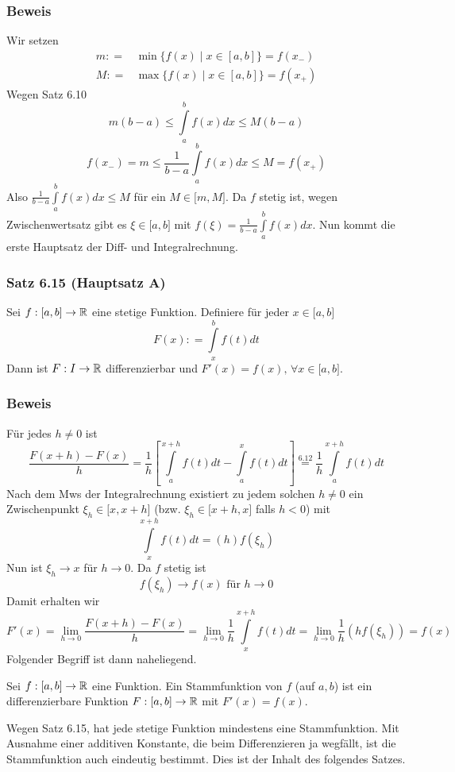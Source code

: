 \subsubsection*{Beweis}
Wir setzen 
\begin{align*}
m: =&\min \{ f(x)\mid x \in [a,b]\}  = f({x_ - })\\
M: =&\max \{ f(x)\mid x \in [a,b]\}  = f({x_ + })
\end{align*}
Wegen Satz 6.10
\[m(b - a) \le \int\limits_a^b {f(x)dx \le M(b - a)} \]
\[f({x_ - }) = m \le \frac{1}{{b - a}}\int\limits_a^b {f(x)dx \le M = f({x_ + })} \]
Also $\frac{1}{{b - a}}\int\limits_a^b {f(x)dx \le M} $ für ein $M\in\lbrack m,M\rbrack$. Da $f$ stetig ist, wegen Zwischenwertsatz gibt es $\xi\in\lbrack a,b\rbrack$ mit $f(\xi ) = \frac{1}{{b - a}}\int\limits_a^b {f(x)dx} $. Nun kommt die erste Hauptsatz der Diff- und Integralrechnung.\\

\subsubsection*{Satz 6.15 (Hauptsatz A)}
Sei $f:\lbrack a,b\rbrack\to\mathbb{R}$ eine stetige Funktion. Definiere für jeder $x\in\lbrack a,b\rbrack$ \[F(x): = \int\limits_x^b {f(t)dt} \]
Dann ist $F:I\to\mathbb{R}$ differenzierbar und $F'(x)=f(x)\text{, }\forall x \in\lbrack a,b\rbrack$.\\
\subsubsection*{Beweis}
Für jedes $h\neq 0$ ist \[\frac{{F(x + h) - F(x)}}{h} = \frac{1}{h}\left[ {\int\limits_a^{x + h} {f(t)dt}  - \int\limits_a^x {f(t)dt} } \right] \mathop  = \limits^{6.12}  \frac{1}{h}\int\limits_a^{x + h} {f(t)dt} \]
Nach dem Mws der Integralrechnung existiert zu jedem solchen $h\neq 0$ ein Zwischenpunkt $\xi_h\in\lbrack x,x+h\rbrack$ (bzw. $\xi_h\in\lbrack x + h,x\rbrack$ falls $h<0$) mit \[\int\limits_x^{x + h} {f(t)dt = (h)f({\xi _h})} \]
Nun ist $\xi_h \to x$ für $h\to 0$. Da $f$ stetig ist \[f(\xi_h)\to f(x) \text{ für } h\to 0\]
Damit erhalten wir \[F'(x) = \mathop {\lim }\limits_{h \to 0} \frac{{F(x + h) - F(x)}}{h} = \mathop {\lim }\limits_{h \to 0} \frac{1}{h}\int\limits_x^{x + h} {f(t)dt = } \mathop {\lim }\limits_{h \to 0} \frac{1}{h}(hf({\xi _h})) = f(x)\]
Folgender Begriff ist dann naheliegend. \\

\begin{definition}{6.16}
 Sei $f:\lbrack a,b\rbrack\to\mathbb{R}$ eine Funktion. Ein Stammfunktion von $f$ (auf $a,b$) ist ein differenzierbare Funktion $F:\lbrack a,b\rbrack\to\mathbb{R}$ mit $F'(x)=f(x)$.\\
\end{definition}
\noindent Wegen Satz 6.15, hat jede stetige Funktion mindestens eine Stammfunktion. Mit Ausnahme einer additiven Konstante, die beim Differenzieren ja wegfällt, ist die Stammfunktion auch eindeutig bestimmt. Dies ist der Inhalt des folgendes Satzes.\\

